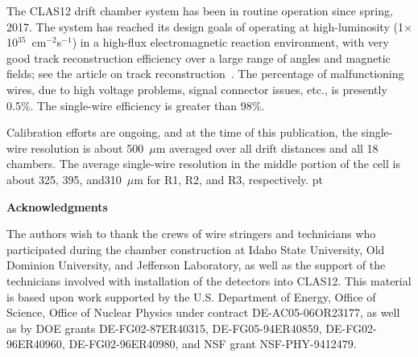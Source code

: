The CLAS12 drift chamber system has been in routine operation since spring, 2017. 
The system has reached its design goals of operating at high-luminosity
(1$\times$10$^{35}$~cm$^{-2}$s$^{-1}$) in a high-flux electromagnetic reaction
environment, with very good track reconstruction efficiency over a large range of angles and 
magnetic fields; see the article on track reconstruction~\cite{recon-nim}.  
The percentage of malfunctioning wires, due to high voltage problems, signal
connector issues, etc., is presently 0.5\%.
The single-wire efficiency is greater than 98\%.

Calibration efforts are ongoing, and at the time of this publication, the
single-wire resolution is about 500~$\mu$m averaged over all drift distances and
all 18 chambers.  The average single-wire resolution in the middle 
portion of the cell is about 325, 395, and310~$\mu$m for R1, R2, and R3, respectively.
 pt

{\large{\bf Acknowledgments}}

\vskip 10pt

The authors wish to thank the crews of wire stringers and technicians who 
participated during the chamber construction at Idaho State University,
Old Dominion University, and Jefferson Laboratory, as well as the support of 
the technicians involved with installation of the detectors into CLAS12. 
This material is based upon work supported by the U.S. Department of Energy,
Office of Science, Office of Nuclear Physics under contract DE-AC05-06OR23177,
as well as by DOE grants DE-FG02-87ER40315, DE-FG05-94ER40859,
DE-FG02-96ER40960, DE-FG02-96ER40980, and NSF grant NSF-PHY-9412479.




